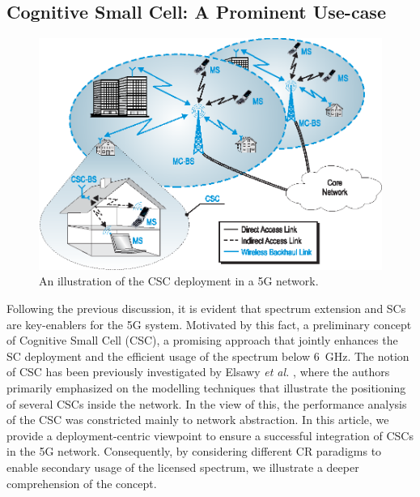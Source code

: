 \subsection{Cognitive Small Cell: A Prominent Use-case}
\begin{figure}[!t]
\centering
\includegraphics[width = \columnwidth]{figures/Cellular_Scenario_CR6F}
\caption{An illustration of the CSC deployment in a 5G network.}
\label{fig:scenario}
\end{figure}



Following the previous discussion, it is evident that spectrum extension and SCs are key-enablers for the 5G system.
Motivated by this fact, a preliminary concept of Cognitive Small Cell (CSC), a promising approach that jointly enhances the SC deployment and the efficient usage of the spectrum below \SI{6}{GHz}. The notion of CSC has been previously investigated by Elsawy \textit{et al.} \cite{Elsawy13}, where the authors primarily emphasized on the modelling techniques that illustrate the positioning of several CSCs inside the network. In the view of this, the performance analysis of the CSC was constricted mainly to network abstraction. In this article, we provide a deployment-centric viewpoint to ensure a successful integration of CSCs in the 5G network. Consequently, by considering different CR paradigms to enable secondary usage of the licensed spectrum, we illustrate a deeper comprehension of the concept. %

